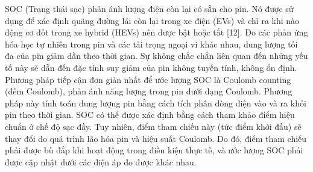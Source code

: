 \documentclass[a4paper,11pt]{article}
\theoremstyle{mytheor}
\begin{document}
SOC (Trạng thái sạc) phản ánh lượng điện còn lại có sẵn cho pin. Nó được sử dụng để xác định quãng đường lái còn lại trong xe điện (EVs) và chỉ ra khi nào động cơ đốt trong xe hybrid (HEVs) nên được bật hoặc tắt [12]. Do các phản ứng hóa học tự nhiên trong pin và các tải trọng ngoại vi khác nhau, dung lượng tối đa của pin giảm dần theo thời gian. Sự không chắc chắn liên quan đến những yếu tố này sẽ dẫn đến đặc tính suy giảm của pin không tuyến tính, không ổn định. Phương pháp tiếp cận đơn giản nhất để ước lượng SOC là Coulomb counting (đếm Coulomb), phản ánh năng lượng trong pin dưới dạng Coulomb. Phương pháp này tính toán dung lượng pin bằng cách tích phân dòng điện vào và ra khỏi pin theo thời gian. SOC có thể được xác định bằng cách tham khảo điểm hiệu chuẩn ở chế độ sạc đầy. Tuy nhiên, điểm tham chiếu này (tức điểm khởi đầu) sẽ thay đổi do quá trình lão hóa pin và hiệu suất Coulomb. Do đó, điểm tham chiếu phải được bù đắp khi hoạt động trong điều kiện thực tế, và ước lượng SOC phải được cập nhật dưới các điện áp đo được khác nhau.
\end{document}
